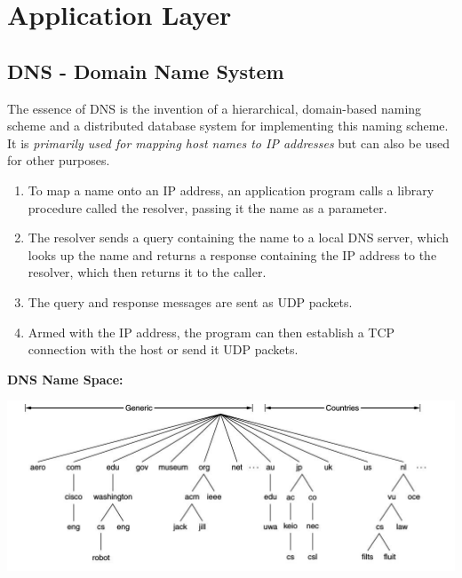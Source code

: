 \documentclass[a4paper,oneside]{book}
\begin{document}
\chapter{Application Layer}
\section{DNS - Domain Name System}
The essence of DNS is the invention of a hierarchical, domain-based naming scheme and a distributed database system for implementing this naming scheme. It is \textit{primarily used for mapping host names to IP addresses} but can also be used for other purposes. \\
\begin{enumerate}
\item To map a name onto an IP address, an application program calls a library procedure called the resolver, passing it the name as a parameter. 
\item The resolver sends a query containing the name to a local DNS server, which looks up the name and returns a response containing the IP address to the resolver, which then returns it to the caller. 
\item The query and response messages are sent as UDP packets.
\item Armed with the IP address, the program can then establish a TCP connection with the host or send it UDP packets.
\end{enumerate}
\textbf{DNS Name Space:}\\
\begin{minipage}{0.5\textwidth}
\centering
{}
\includegraphics[width=\textwidth,height=0.7\textwidth]{Images/dnsnamespace}
\label{fig:dns}
\end{minipage}
\end{document}

